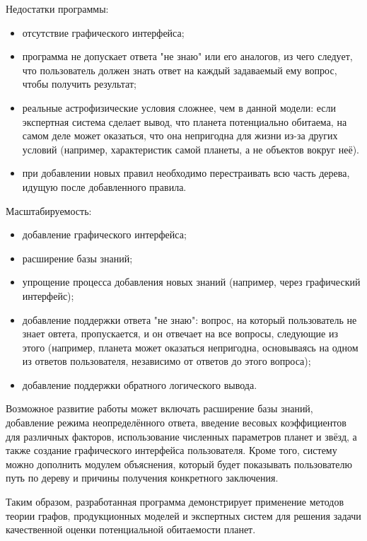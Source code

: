 \documentclass[14pt,a4paper]{extarticle}
\begin{document}
Недостатки программы:

\begin{itemize}
    \item отсутствие графического интерфейса;
    \item программа не допускает ответа "не знаю" или его аналогов, из чего следует, что пользователь должен знать ответ на каждый задаваемый ему вопрос, чтобы получить результат;
    \item реальные астрофизические условия сложнее, чем в данной модели: если экспертная система сделает вывод, что планета потенциально обитаема, на самом деле может оказаться, что она непригодна для жизни из-за других условий (например, характеристик самой планеты, а не объектов вокруг неё).
    \item при добавлении новых правил необходимо перестраивать всю часть дерева, идущую после добавленного правила.
\end{itemize}

Масштабируемость:

\begin{itemize}
    \item добавление графического интерфейса;
    \item расширение базы знаний;
    \item упрощение процесса добавления новых знаний (например, через графический интерфейс);
    \item добавление поддержки ответа "не знаю": вопрос, на который пользователь не знает овтета, пропускается, и он отвечает на все вопросы, следующие из этого (например, планета может оказаться непригодна, основываясь на одном из ответов пользователя, независимо от ответов до этого вопроса);
    \item добавление поддержки обратного логического вывода.
\end{itemize}

Возможное развитие работы может включать расширение базы знаний, добавление режима неопределённого ответа, введение весовых коэффициентов для различных факторов, использование численных параметров планет и звёзд, а также создание графического интерфейса пользователя. Кроме того, систему можно дополнить модулем объяснения, который будет показывать пользователю путь по дереву и причины получения конкретного заключения.

Таким образом, разработанная программа демонстрирует применение методов теории графов, продукционных моделей и экспертных систем для решения задачи качественной оценки потенциальной обитаемости планет.
\end{document}
